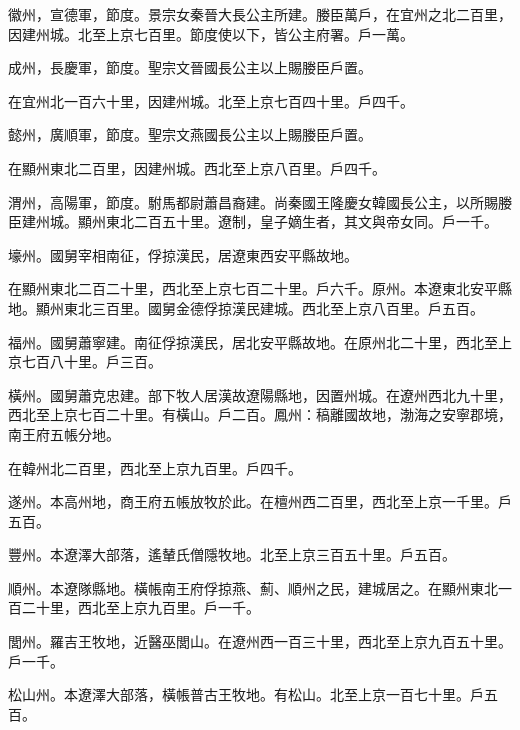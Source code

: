 \begin{pinyinscope}
 徽州，宣德軍，節度。景宗女秦晉大長公主所建。媵臣萬戶，在宜州之北二百里，因建州城。北至上京七百里。節度使以下，皆公主府署。戶一萬。



 成州，長慶軍，節度。聖宗文晉國長公主以上賜媵臣戶置。



 在宜州北一百六十里，因建州城。北至上京七百四十里。戶四千。



 懿州，廣順軍，節度。聖宗文燕國長公主以上賜媵臣戶置。



 在顯州東北二百里，因建州城。西北至上京八百里。戶四千。



 渭州，高陽軍，節度。駙馬都尉蕭昌裔建。尚秦國王隆慶女韓國長公主，以所賜媵臣建州城。顯州東北二百五十里。遼制，皇子嫡生者，其文與帝女同。戶一千。



 壕州。國舅宰相南征，俘掠漢民，居遼東西安平縣故地。



 在顯州東北二百二十里，西北至上京七百二十里。戶六千。原州。本遼東北安平縣地。顯州東北三百里。國舅金德俘掠漢民建城。西北至上京八百里。戶五百。



 福州。國舅蕭寧建。南征俘掠漢民，居北安平縣故地。在原州北二十里，西北至上京七百八十里。戶三百。



 橫州。國舅蕭克忠建。部下牧人居漢故遼陽縣地，因置州城。在遼州西北九十里，西北至上京七百二十里。有橫山。戶二百。鳳州：稿離國故地，渤海之安寧郡境，南王府五帳分地。



 在韓州北二百里，西北至上京九百里。戶四千。



 遂州。本高州地，商王府五帳放牧於此。在檀州西二百里，西北至上京一千里。戶五百。



 豐州。本遼澤大部落，遙輦氏僧隱牧地。北至上京三百五十里。戶五百。



 順州。本遼隊縣地。橫帳南王府俘掠燕、薊、順州之民，建城居之。在顯州東北一百二十里，西北至上京九百里。戶一千。



 閭州。羅吉王牧地，近醫巫閭山。在遼州西一百三十里，西北至上京九百五十里。戶一千。



 松山州。本遼澤大部落，橫帳普古王牧地。有松山。北至上京一百七十里。戶五百。




\end{pinyinscope}
